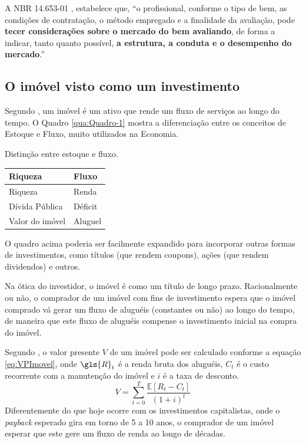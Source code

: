 \documentclass[
	12pt,				%
	oneside,			%
	a4paper,			%
	chapter=TITLE,		%
	section=TITLE,		%
	english,			%
	brazil				%
	]{abntex2}
\begin{document}
A NBR 14.653-01 \autocite*[12]{NBR1465301}, estabelece que, ``o profissional, conforme o
tipo de bem, as condições de contratação, o método empregado e a finalidade da
avaliação, pode \textbf{tecer considerações sobre o mercado do bem avaliando}, de
forma a indicar, tanto quanto possível, \textbf{a estrutura, a conduta e o desempenho
do mercado}.''

\hypertarget{o-imuxf3vel-visto-como-um-investimento}{%
\subsection{O imóvel visto como um investimento}\label{o-imuxf3vel-visto-como-um-investimento}}

Segundo \textcite{Malpezzi2002TheRO}, um imóvel é um ativo que rende um fluxo de serviços
ao longo do tempo. O Quadro \ref{qua:Quadro-1} mostra a diferenciação entre os
conceitos de Estoque e Fluxo, muito utilizados na Economia.
\begin{quadro}[htb]
    \centering
    \caption{\label{qua:Quadro-1}Distinção entre estoque e fluxo.}  
    \begin{tabular}{|l|l|}
        \hline
        \textbf{Riqueza}  & \textbf{Fluxo}\\ \hline
         Riqueza          & Renda         \\ \hline
         Dívida Pública   & Déficit       \\ \hline
         Valor do imóvel  & Aluguel       \\ \hline
    \end{tabular}
\end{quadro}
O quadro acima poderia ser facilmente expandido para incorporar outras formas de
investimentos, como títulos (que rendem coupons), ações (que rendem dividendos)
e outros.

Na ótica do investidor, o imóvel é como um título de longo prazo. Racionalmente
ou não, o comprador de um imóvel com fins de investimento espera que o imóvel
comprado vá gerar um fluxo de aluguéis (constantes ou não) ao longo do tempo, de
maneira que este fluxo de aluguéis compense o investimento inicial na compra do
imóvel.

Segundo \textcite[p.~4]{Malpezzi2002TheRO}, o valor presente \(V\) de um imóvel pode ser
calculado conforme a equação \eqref{eq:VPImovel}, onde \(\gls{R}_t\) é a renda
bruta dos aluguéis, \(C_t\) é o custo recorrente com a manutenção do imóvel e \(i\)
é a taxa de desconto.
\begin{equation}
V = \sum_{t=0}^T \frac{\mathbb{E}[R_t-C_t]}{(1+i)^t}
\label{eq:VPImovel}
\end{equation}
Diferentemente do que hoje ocorre com os investimentos capitalistas, onde o
\emph{payback} esperado gira em torno de 5 a 10 anos, o comprador de um imóvel
esperar que este gere um fluxo de renda ao longo de décadas.
\end{document}
